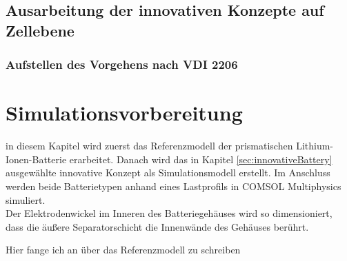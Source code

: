 \subsection{Ausarbeitung der innovativen Konzepte auf Zellebene}\label{sub:ausarbeitungKonzept}

\subsubsection{Aufstellen des Vorgehens nach VDI 2206}\label{subsub:vorgehennachVDI}




\newpage
\section{Simulationsvorbereitung}\label{sec:SimulationPREP}

in diesem Kapitel wird zuerst das Referenzmodell der prismatischen Lithium-Ionen-Batterie erarbeitet. Danach wird das in Kapitel \ref{sec:innovativeBattery} ausgewählte innovative Konzept als Simulationsmodell erstellt. Im Anschluss werden beide Batterietypen anhand eines Lastprofils in COMSOL Multiphysics\textsuperscript{\textregistered} simuliert.\\



Der Elektrodenwickel im Inneren des Batteriegehäuses wird so dimensioniert, dass die äußere Separatorschicht die Innenwände des Gehäuses berührt.

Hier fange ich an über das Referenzmodell zu schreiben


	